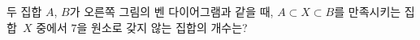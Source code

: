 \noindent\begin{minipage}[t]{0.58\linewidth}\vspace{0pt}\raggedright 두 집합 $A$, $B$가 오른쪽 그림의 벤 다이어그램과 같을 때, $A\subset X\subset B$를 만족시키는 집합~$X$ 중에서 $7$을 원소로 갖지 않는 집합의 개수는?\end{minipage}\hfill\begin{minipage}[t]{0.4\linewidth}\vspace{0pt}\centering \resizebox{\ifdim\width>\linewidth\linewidth\else\width\fi}{!}{}\end{minipage}\par
{}

